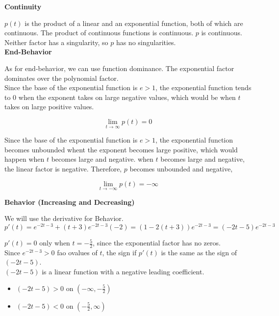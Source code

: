 \documentclass{ximera}
\begin{document}
\begin{example}
\textbf{Continuity}

$p(t)$ is the product of a linear and an exponential function, both of which are continuous.  The product of continuous functions is continuous.  $p$ is continuous. \\

Neither factor has a singularity, so $p$ has no singularities. \\





\textbf{End-Behavior}


As for end-behavior, we can use function dominance. The exponential factor dominates over the polynomial factor.  \\


Since the base of the exponential function is $e > 1$, the exponential function tends to $0$ when the exponent takes on large negative values, which would be when $t$ takes on large positive values.  

\[
\lim\limits_{t \to \infty} p(t) = 0 
\]



Since the base of the exponential function is $e > 1$, the exponential function becomes unbounded whent the exponent becomes large positive, which would happen when $t$ becomes large and negative.  when $t$ becomes large and negative, the linear factor is negative.  Therefore, $p$ becomes unbounded and negative,

\[
\lim\limits_{t \to -\infty} p(t) = -\infty 
\]
 


\textbf{Behavior (Increasing and Decreasing)}


We will use the derivative for Behavior. \\


\[
p'(t) = e^{-2t-3} + (t+3) e^{-2t-3} (-2) =  (1 - 2 (t+3)) e^{-2t-3} =  (-2t - 5) e^{-2t-3}
\]


$p'(t) = 0$ only when $t = -\frac{5}{2}$, since the exponential factor has no zeros. \\


Since $e^{-2t-3} > 0$ fao ovalues of $t$, the sign if $p'(t)$ is the same as the sign of $(-2t - 5)$. \\ 

$(-2t - 5)$ is a linear function with a negative leading coefficient.


\begin{itemize}
  \item $(-2t - 5) > 0$ on $\left( -\infty, -\frac{5}{2} \right)$ 
  \item $(-2t - 5) < 0$ on $\left( -\frac{5}{2}, \infty \right)$ 
\end{itemize}



\end{example}
\end{document}
